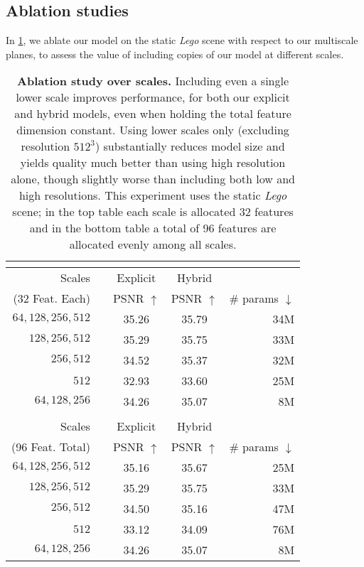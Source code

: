 \documentclass[10pt,twocolumn,letterpaper]{article}
\makeatletter
\renewcommand{\paragraph}{\@startsection{paragraph}{4}{\z@}{0.65ex \@plus 1ex \@minus .2ex}{-1em}{\normalfont \normalsize \bfseries }}
\makeatother
\begin{document}
\subsection{Ablation studies}

\paragraph{Multiscale.}
In \cref{tab:multiscale}, we ablate our model on the static \emph{Lego} scene \cite{nerf} with respect to our multiscale planes, to assess the value of including copies of our model at different scales. 

\renewcommand{\tabcolsep}{6pt}
\begin{table}[ht]
  \centering
  \begin{tabular}{rlccr}
    \multicolumn{5}{c}{} \\
    \toprule
     Scales & & Explicit & Hybrid  &  \\ (32 Feat. Each) & & PSNR $\uparrow$ & PSNR $\uparrow$ & \# params $\downarrow$ \\
    \cmidrule(){1-1} \cmidrule(){3-5}
    $64,128,256,512$ &&	35.26 & 35.79 & 34M \\
    $128,256,512$ && 35.29 & 35.75 & 33M \\
    $256,512$ && 34.52 & 35.37 & 32M \\
    $512$ && 32.93 & 33.60 & 25M \\
    $64,128,256$\hspace{0.67cm} && 34.26 & 35.07 & 8M	\\
\bottomrule
    \\
    \toprule
     Scales & & Explicit & Hybrid  &  \\ (96 Feat. Total) & & PSNR $\uparrow$ & PSNR $\uparrow$ & \# params $\downarrow$ \\
    \cmidrule(){1-1} \cmidrule(){3-5} 
    $64,128,256,512$ && 35.16 & 35.67 & 25M \\
    $128,256,512$ && 35.29 & 35.75 & 33M \\
    $256,512$ && 34.50 & 35.16 & 47M \\
    $512$ && 33.12 & 34.09 & 76M \\
    $64,128,256$\hspace{0.67cm} && 34.26 & 35.07 & 8M \\
    \bottomrule
  \end{tabular}
  \caption{\textbf{Ablation study over scales.} 
  Including even a single lower scale improves performance, for both our explicit and hybrid models, even when holding the total feature dimension constant. Using lower scales only (excluding resolution $512^3$) substantially reduces model size and yields quality much better than using high resolution alone, though slightly worse than including both low and high resolutions. This experiment uses the static \emph{Lego} scene; in the top table each scale is allocated 32 features and in the bottom table a total of 96 features are allocated evenly among all scales.}
  \label{tab:multiscale}
\end{table}
\end{document}
